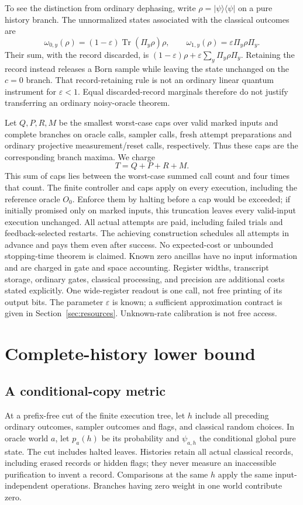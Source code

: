 \documentclass[11pt]{article}
\theoremstyle{remark}
\newcommand{\eps}{\varepsilon}
\newcommand{\ket}[1]{\lvert #1\rangle}
\newcommand{\bra}[1]{\langle #1\rvert}
\newcommand{\Tr}{\operatorname{Tr}}
\begin{document}
To see the distinction from ordinary dephasing, write
$\rho=\ket{\psi}\bra{\psi}$ on a pure history branch. The unnormalized states
associated with the classical outcomes are
\begin{equation}\label{eq:record}
 \omega_{0,y}(\rho)=(1-\eps)\Tr(\Pi_y\rho)\rho,
 \qquad
 \omega_{1,y}(\rho)=\eps\Pi_y\rho\Pi_y.
\end{equation}
Their sum, with the record discarded, is
$(1-\eps)\rho+\eps\sum_y\Pi_y\rho\Pi_y$.
Retaining the record instead releases a Born sample while leaving the state
unchanged on the $c=0$ branch. That record-retaining rule is not an ordinary
linear quantum instrument for $\eps<1$. Equal discarded-record marginals
therefore do not justify transferring an ordinary noisy-oracle theorem.

Let $Q,P,R,M$ be the smallest worst-case caps over valid marked inputs
and complete branches on oracle calls, sampler calls, fresh attempt
preparations and ordinary projective measurement/reset calls, respectively.
Thus these caps are the corresponding branch maxima. We charge
\begin{equation}\label{eq:cost}
 T=Q+P+R+M.
\end{equation}
This sum of caps lies between the worst-case summed call count and four
times that count. The finite controller and caps apply on every execution,
including the reference oracle $O_0$. Enforce them by halting before a cap
would be exceeded; if initially promised only on marked inputs, this
truncation leaves every valid-input execution unchanged.
All actual attempts are paid, including failed trials and
feedback-selected restarts. The achieving construction schedules all attempts
in advance and pays them even after success. No expected-cost or unbounded
stopping-time theorem is claimed.
Known zero ancillas have no input information and are charged in gate and
space accounting. Register widths, transcript storage, ordinary gates,
classical processing, and precision are additional costs stated explicitly.
One wide-register readout is one call, not free printing of its output bits.
The parameter $\eps$ is known; a sufficient approximation contract is given
in Section~\ref{sec:resources}. Unknown-rate calibration is not free access.

\section{Complete-history lower bound}\label{sec:lower}
\subsection{A conditional-copy metric}
At a prefix-free cut of the finite execution tree, let $h$ include all
preceding ordinary outcomes, sampler
outcomes and flags, and classical random choices. In oracle world $a$, let
$p_a(h)$ be its probability and $\psi_{a,h}$ the conditional global pure
state. The cut includes halted leaves. Histories retain all actual classical
records, including erased records or hidden flags; they never measure an
inaccessible purification to invent a record.
Comparisons at the same $h$ apply the same input-independent
operations. Branches having zero weight in one world contribute zero.
\end{document}
